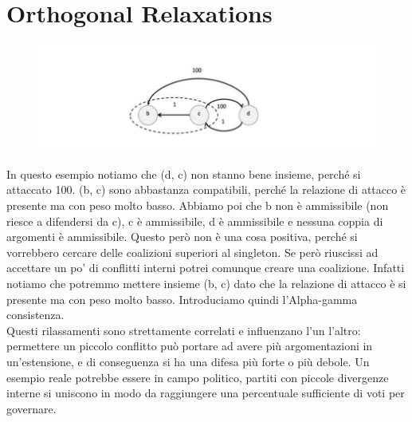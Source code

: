     \section{Orthogonal Relaxations}
    \begin{figure}[htp]
        \centering
        \includegraphics[width=12cm, keepaspectratio]{img/Cap6/ortogonal.png}
    \end{figure}
    \noindent In questo esempio notiamo che (d, c) non stanno bene insieme,
    perché si attaccato 100. (b, c) sono abbastanza compatibili, perché la
    relazione di attacco è presente ma con peso molto basso. Abbiamo poi che b
    non è ammissibile (non riesce a difendersi da c), c è ammissibile, d è
    ammissibile e nessuna coppia di argomenti è ammissibile. Questo però non è
    una cosa positiva, perché si vorrebbero cercare delle coalizioni superiori
    al singleton. Se però riuscissi ad accettare un po' di conflitti interni
    potrei comunque creare una coalizione. Infatti notiamo che potremmo mettere
    insieme (b, c) dato che la relazione di attacco è si presente ma con peso
    molto basso. Introduciamo quindi l'Alpha-gamma consistenza.\\
    Questi rilassamenti sono strettamente correlati e influenzano l'un l'altro:
    permettere un piccolo conflitto può portare ad avere più argomentazioni in
    un'estensione, e di conseguenza si ha una difesa più forte o più debole. Un
    esempio reale potrebbe essere in campo politico, partiti con piccole
    divergenze interne si uniscono in modo da raggiungere una percentuale
    sufficiente di voti per governare.

